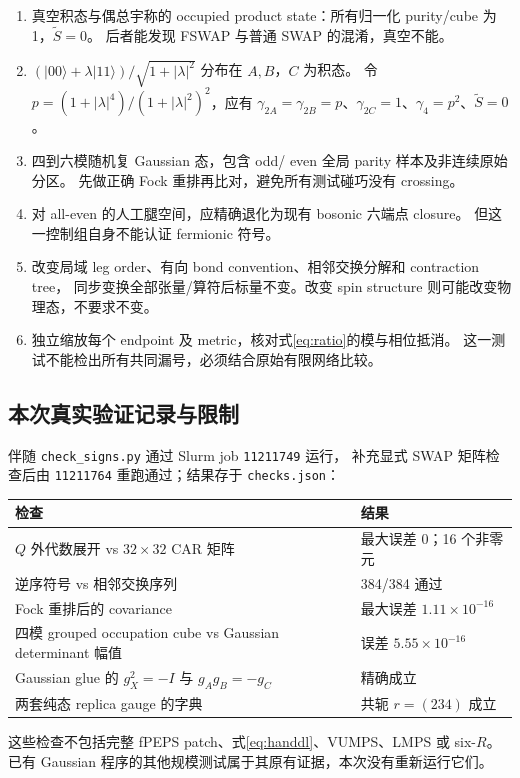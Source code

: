 \documentclass[11pt]{article}
\newcommand{\tS}{\widetilde S}
\newcommand{\code}[1]{\texttt{\small #1}}
\begin{document}
\begin{enumerate}
\item 真空积态与偶总宇称的 occupied product state：所有归一化 purity/cube 为 1，$\tS=0$。
      后者能发现 FSWAP 与普通 SWAP 的混淆，真空不能。
\item $(|00\rangle+\lambda|11\rangle)/\sqrt{1+|\lambda|^2}$ 分布在 $A,B$，$C$ 为积态。
      令 $p=(1+|\lambda|^4)/(1+|\lambda|^2)^2$，应有
      $\gamma_{2A}=\gamma_{2B}=p$、$\gamma_{2C}=1$、$\gamma_4=p^2$、$\tS=0$。
\item 四到六模随机复 Gaussian 态，包含 odd/ even 全局 parity 样本及非连续原始分区。
      先做正确 Fock 重排再比对，避免所有测试碰巧没有 crossing。
\item 对 all-even 的人工腿空间，应精确退化为现有 bosonic 六端点 closure。
      但这一控制组自身不能认证 fermionic 符号。
\item 改变局域 leg order、有向 bond convention、相邻交换分解和 contraction tree，
      同步变换全部张量/算符后标量不变。改变 spin structure 则可能改变物理态，不要求不变。
\item 独立缩放每个 endpoint 及 metric，核对式\eqref{eq:ratio}的模与相位抵消。
      这一测试不能检出所有共同漏号，必须结合原始有限网络比较。
\end{enumerate}

\subsection{本次真实验证记录与限制}

伴随 \code{check\_signs.py} 通过 Slurm job \code{11211749} 运行，
补充显式 SWAP 矩阵检查后由 \code{11211764} 重跑通过；结果存于 \code{checks.json}：
\begin{center}
\begin{tabular}{p{}p{}}\toprule
检查 & 结果\\\midrule
$Q$ 外代数展开 vs $32\times32$ CAR 矩阵 & 最大误差 $0$；16 个非零元\\
逆序符号 vs 相邻交换序列 & 384/384 通过\\
Fock 重排后的 covariance & 最大误差 $1.11\times10^{-16}$\\
四模 grouped occupation cube vs Gaussian determinant 幅值 & 误差 $5.55\times10^{-16}$\\
Gaussian glue 的 $g_X^2=-I$ 与 $g_Ag_B=-g_C$ & 精确成立\\
两套纯态 replica gauge 的字典 & 共轭 $r=(234)$ 成立\\\bottomrule
\end{tabular}
\end{center}
这些检查不包括完整 fPEPS patch、式\eqref{eq:handdl}、VUMPS、LMPS 或 six-$R$。
已有 Gaussian 程序的其他规模测试属于其原有证据，本次没有重新运行它们。
\end{document}
